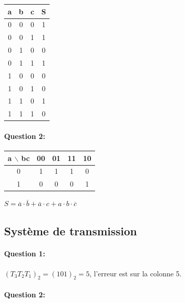  \begin{center}
 \begin{tabular}{|c|c|c|c|}
 \hline
 a & b & c & S \\
 \hline
 0  & 0  & 0  & 1 \\
 \hline
 0  & 0  & 1  & 1 \\
 \hline
 0  & 1  & 0  & 0 \\
 \hline
 0  & 1  & 1  & 1 \\
 \hline
 1  & 0  & 0  & 0 \\
 \hline
 1  & 0  & 1  & 0 \\
 \hline
 1  & 1  & 0  & 1 \\
 \hline
 1  & 1  & 1  & 0 \\
 \hline
 \end{tabular}
 \end{center}

\paragraph{Question 2:}

\begin{center}
\begin{tabular}{|c|c|c|c|c|}
\hline
a $\backslash$ bc & 00 & 01 & 11 & 10 \\
\hline
0  & 1 & 1 & 1 & 0 \\
\hline
1  & 0 & 0 & 0 & 1 \\
\hline
\end{tabular} 
\end{center}

$S=\overline{a}\cdot\overline{b}+\overline{a}\cdot c+a\cdot b \cdot\overline{c}$

\subsection{Système de transmission}

\paragraph{Question 1:} $(T_3T_2T_1)_2=(101)_2=5$, l'erreur est sur la colonne 5.

\paragraph{Question 2:} ~\

